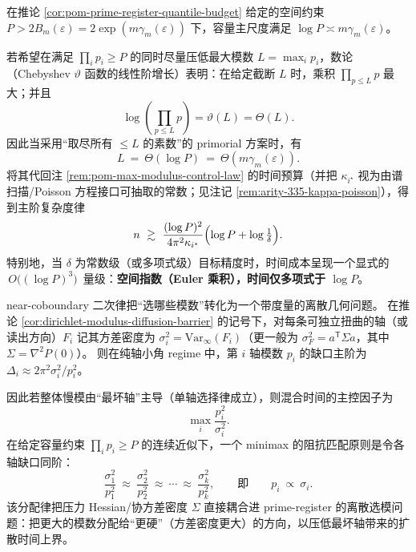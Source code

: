 \begin{remark}\label{rem:pom-primorial-polylog-time}
在推论 \ref{cor:pom-prime-register-quantile-budget} 给定的空间约束
\(
P>2B_m(\varepsilon)=2\exp(m\gamma_m(\varepsilon))
\)
下，容量主尺度满足 \(\log P\asymp m\gamma_m(\varepsilon)\)。
\par
若希望在满足 \(\prod_i p_i\ge P\) 的同时尽量压低最大模数 \(L=\max_i p_i\)，数论（Chebyshev \(\vartheta\) 函数的线性阶增长）表明：在给定截断 \(L\) 时，乘积 \(\prod_{p\le L}p\) 最大；并且
\[
\log\!\left(\prod_{p\le L}p\right)=\vartheta(L)=\Theta(L).
\]
因此当采用“取尽所有 \(\le L\) 的素数”的 primorial 方案时，有
\[
L\ =\ \Theta(\log P)\ =\ \Theta(m\gamma_m(\varepsilon)).
\]
将其代回注 \ref{rem:pom-max-modulus-control-law} 的时间预算（并把 \(\kappa_{i^\star}\) 视为由谱扫描/Poisson 方程接口可抽取的常数；见注记 \ref{rem:arity-335-kappa-poisson}），得到主阶复杂度律
\[
n\ \gtrsim\ \frac{(\log P)^2}{4\pi^2\kappa_{i^\star}}\Bigl(\log P+\log\tfrac{1}{\delta}\Bigr).
\]
特别地，当 \(\delta\) 为常数级（或多项式级）目标精度时，时间成本呈现一个显式的 \(\,O\big((\log P)^3\big)\,\) 量级：\textbf{空间指数（Euler 乘积），时间仅多项式于 \(\log P\)}。
\end{remark}

\begin{remark}\label{rem:pom-variance-matched-moduli}
near-coboundary 二次律把“选哪些模数”转化为一个带度量的离散几何问题。
在推论 \ref{cor:dirichlet-modulus-diffusion-barrier} 的记号下，对每条可独立扭曲的轴（或读出方向）\(F_i\) 记其方差密度为 \(\sigma_i^2=\mathrm{Var}_\infty(F_i)\)（更一般为 \(\sigma_F^2=a^{\mathsf T}\Sigma a\)，其中 \(\Sigma=\nabla^2P(0)\)）。
则在纯轴小角 regime 中，第 \(i\) 轴模数 \(p_i\) 的缺口主阶为 \(\Delta_i\approx 2\pi^2\sigma_i^2/p_i^2\)。
\par
因此若整体慢模由“最坏轴”主导（单轴选择律成立），则混合时间的主控因子为
\[
\max_i\frac{p_i^2}{\sigma_i^2}.
\]
在给定容量约束 \(\prod_i p_i\ge P\) 的连续近似下，一个 minimax 的阻抗匹配原则是令各轴缺口同阶：
\[
\frac{\sigma_1^2}{p_1^2}\ \approx\ \frac{\sigma_2^2}{p_2^2}\ \approx\ \cdots\ \approx\ \frac{\sigma_k^2}{p_k^2},
\qquad\text{即}\qquad
p_i\ \propto\ \sigma_i.
\]
该分配律把压力 Hessian/协方差密度 \(\Sigma\) 直接耦合进 prime-register 的离散选模问题：把更大的模数分配给“更硬”（方差密度更大）的方向，以压低最坏轴带来的扩散时间上界。
\end{remark}

